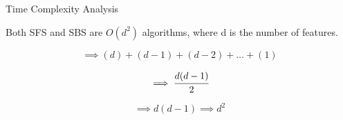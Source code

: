 \documentclass{beamer}
\begin{document}
\begin{frame}{Time Complexity Analysis}
    
    Both SFS and SBS are $O(d^2)$ algorithms, where d is the number of features.
    
     \begin{equation*}
         \implies (d) + (d-1) + (d-2) + \dots + (1)
           \end{equation*}
     
     \begin{equation*}
          \implies \cfrac{d(d-1)}{2}
            \end{equation*}
     
     \begin{equation*}
         \implies d(d-1)  \implies d^{2}
           \end{equation*}
\end{frame}
\end{document}
